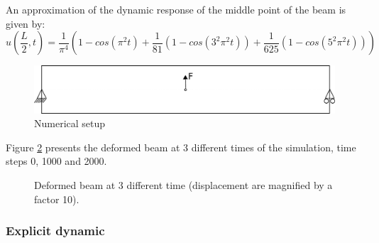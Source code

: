 An approximation  of the  dynamic response of  the middle  point of the  beam is
given by:
\begin{equation}\label{eqn:smm:implicit}
  u\left(\frac{L}{2}, t\right) = \frac{1}{\pi^4} \left(1 - cos\left(\pi^2 t\right) +
    \frac{1}{81}\left(1 - cos\left(3^2 \pi^2 t\right)\right) +
    \frac{1}{625}\left(1 - cos\left(5^2 \pi^2 t\right)\right)\right)
\end{equation}

\begin{figure}[!htb]
  \centering
  \includegraphics[scale=.6]{figures/implicit_dynamic}
  \caption{Numerical setup}
  \label{fig:smm:implicit:dynamic}
\end{figure}

Figure \ref{fig:smm:implicit:dynamic_solution}  presents the deformed  beam at 3
different times of the simulation, time steps 0, 1000 and 2000.

\begin{figure}[!htb]
  \centering
  \setlength{\unitlength}{0.1\textwidth}

  \caption{Deformed beam at 3 different time (displacement are
    magnified by a factor 10).}
  \label{fig:smm:implicit:dynamic_solution}
\end{figure}

\subsubsection{Explicit dynamic}

